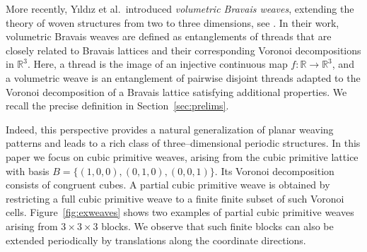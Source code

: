 \documentclass[12pt]{article}
\theoremstyle{definition}
\theoremstyle{remark}
\begin{document}
More recently, Yıldız et al.\ introduced \emph{volumetric Bravais weaves}, extending the theory of woven structures from two to three dimensions, see \cite{tolga}. In their work, volumetric Bravais weaves are defined as entanglements of threads that are closely related to Bravais lattices and their corresponding Voronoi decompositions in $\mathbb{R}^3$. Here, a thread is the image of an injective continuous map
$f:\mathbb R\to\mathbb R^3$, and a volumetric weave is an
entanglement of pairwise disjoint threads adapted to the Voronoi
decomposition of a Bravais lattice satisfying additional properties. We recall the precise definition in
Section~\ref{sec:prelims}.



Indeed, this perspective provides a natural generalization of planar weaving patterns and leads to a rich class of three–dimensional periodic structures.
In this paper we focus on cubic primitive weaves, arising from the cubic
primitive lattice with basis
$
B=\{(1,0,0),(0,1,0),(0,0,1)\}.$
Its Voronoi decomposition consists of congruent cubes. A partial cubic
primitive weave is obtained by restricting a full cubic primitive weave to a
finite finite subset of such Voronoi cells. Figure~\ref{fig:exweaves} shows two examples
of partial cubic
primitive weaves arising from $3\times3\times3$ blocks. We observe that such finite blocks can also be extended
periodically by translations along the coordinate directions.
\end{document}
